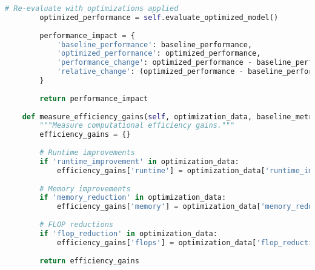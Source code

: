 \begin{lstlisting}[language=Python, caption=Comprehensive computational efficiency optimization framework]
        # Re-evaluate with optimizations applied
        optimized_performance = self.evaluate_optimized_model()
        
        performance_impact = {
            'baseline_performance': baseline_performance,
            'optimized_performance': optimized_performance,
            'performance_change': optimized_performance - baseline_performance,
            'relative_change': (optimized_performance - baseline_performance) / baseline_performance
        }
        
        return performance_impact
    
    def measure_efficiency_gains(self, optimization_data, baseline_metrics):
        """Measure computational efficiency gains."""
        efficiency_gains = {}
        
        # Runtime improvements
        if 'runtime_improvement' in optimization_data:
            efficiency_gains['runtime'] = optimization_data['runtime_improvement']
        
        # Memory improvements
        if 'memory_reduction' in optimization_data:
            efficiency_gains['memory'] = optimization_data['memory_reduction']
        
        # FLOP reductions
        if 'flop_reduction' in optimization_data:
            efficiency_gains['flops'] = optimization_data['flop_reduction']
        
        return efficiency_gains
\end{lstlisting}